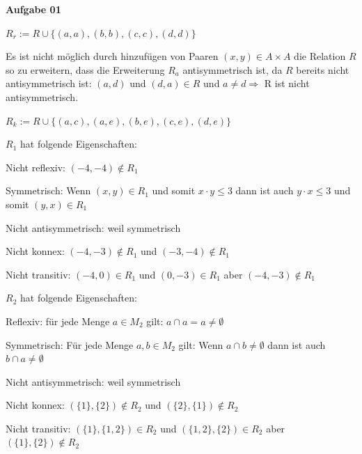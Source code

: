 \documentclass[a4paper,10pt]{article}
\begin{document}
	\parindent0pt
	\textbf{Aufgabe 01}
	\begin{compactenum} [(a)]
		\item
		\begin{compactenum} [(i)]
			\item $ R_r := R \cup \{(a,a),(b,b),(c,c),(d,d)\} $
			\item Es ist nicht möglich durch hinzufügen von Paaren $ (x,y) \in A \times A $ die Relation $ R $ so zu erweitern, dass die Erweiterung $ R_a $ antisymmetrisch ist, da $ R $ bereits nicht antisymmetrisch ist: $ (a,d) $ und $ (d,a) \in R $ und $ a \neq d \Rightarrow $ R ist nicht antisymmetrisch.
			\item $ R_k := R \cup \{(a,c),(a,e),(b,e),(c,e),(d,e)\} $
		\end{compactenum}
		\item $ R_1 $ hat folgende Eigenschaften:
		\begin{compactitem}
			\item Nicht reflexiv: $ (-4,-4) \not\in R_1 $
			\item Symmetrisch: Wenn $ (x,y) \in R_1 $ und somit $ x\cdot y \leq 3 $ dann ist auch $ y\cdot x \leq 3 $ und somit $ (y,x) \in R_1 $
			\item Nicht antisymmetrisch: weil symmetrisch
			\item Nicht konnex: $ (-4,-3) \not\in R_1 $ und $ (-3,-4) \not\in R_1 $
			\item Nicht transitiv: $ (-4,0) \in R_1 $ und $ (0,-3) \in R_1 $ aber $ (-4,-3) \not\in R_1 $
		\end{compactitem}
		$ R_2 $ hat folgende Eigenschaften:
		\begin{compactitem}
			\item Reflexiv: für jede Menge $ a \in M_2 $ gilt: $ a \cap a = a \neq \emptyset $
			\item Symmetrisch: Für jede Menge $ a,b \in M_2 $ gilt: Wenn $ a\cap b \neq \emptyset $ dann ist auch $ b\cap a \neq \emptyset $
			\item Nicht antisymmetrisch: weil symmetrisch
			\item Nicht konnex: $ (\{1\},\{2\}) \not\in R_2 $ und $ (\{2\},\{1\}) \not\in R_2 $
			\item Nicht transitiv: $ (\{1\}, \{1,2\}) \in R_2 $ und $ (\{1,2\},\{2\}) \in R_2 $ aber $ (\{1\},\{2\}) \not\in R_2 $
		\end{compactitem}
	\end{compactenum} \
	
\end{document}

